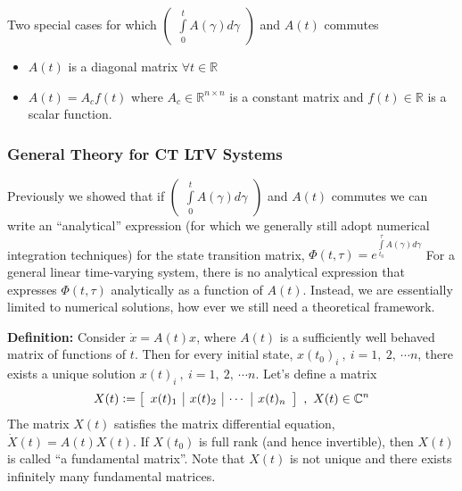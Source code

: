\documentclass[twoside]{article}
\begin{document}
Two special cases for which $\begin{pmatrix} \int\limits_{0}^{t} A(\gamma) d\gamma \end{pmatrix}$ and $A(t)$ commutes
%
\begin{itemize}
	\item $A(t)$ is a diagonal matrix $\forall t \in \mathbb{R}$
	\item $A(t) = A_c f(t)$ where $A_c \in \mathbb{R}^{n \times n}$ is a constant matrix and $f(t) \in \mathbb{R}$ is a scalar function.
\end{itemize}

\subsubsection{General Theory for CT LTV Systems}

Previously we showed that if $\begin{pmatrix} \int\limits_{0}^{t} A(\gamma) d\gamma \end{pmatrix}$ and $A(t)$ commutes we can write an ``analytical'' expression (for which we generally still adopt numerical integration techniques) for the state transition matrix, $\Phi(t,\tau) = e^{ \int\limits_{t_0}^{\tau} A(\gamma) d\gamma }$
For a general linear time-varying system, there is no analytical expression that expresses $\Phi(t,\tau)$ analytically as a function of $A(t)$. Instead, we are essentially limited to numerical solutions, how ever we still need a theoretical framework. 

\textbf{Definition:} Consider $\dot{x} = A(t) x$, where $A(t)$ is a sufficiently well behaved matrix of functions of $t$. Then for every initial state, 
$x(t_0)_i \ , \ i = 1, \ 2, \ \cdots n $, there exists a unique solution $x(t)_i \ , \ i = 1, \ 2, \ \cdots n $. Let's define a matrix 
%
\begin{align*}
X(t) \vcentcolon= \left[ \begin{array}{c|c|c|c} x(t)_1 & x(t)_2 & \cdots & x(t)_n \end{array} \right] \ , \ X(t) \in \mathbb{C}^{n}
\end{align*}
%
The matrix $X(t)$ satisfies the matrix differential equation, $\dot{X}(t) = A(t) X(t)$. If $X(t_0)$ is full rank (and hence invertible), then $X(t)$ is called ``a fundamental matrix''. Note that $X(t)$ is not unique and there exists infinitely many fundamental matrices. 

\vspace{6pt}
\end{document}

